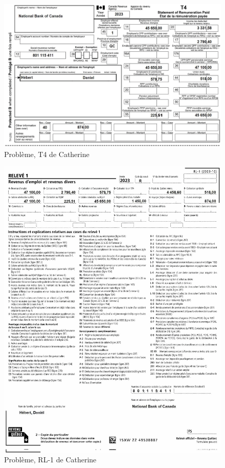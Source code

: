 \begin{figure}
	\centering
	\includegraphics[width=.9\textwidth]{probleme/chapitre-4/Daniel-T4.png}
	\caption{Problème, T4 de Catherine}
	\label{fig:chap4ProblemeCatherineT4}
\end{figure}
\begin{figure}
	\centering
	\includegraphics[width=.9\textwidth]{probleme/chapitre-4/Daniel-RL1.png}
	\caption{Problème, RL-1 de Catherine}
	\label{fig:chap4ProblemeCatherineRL1}
\end{figure}
